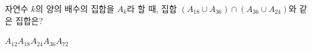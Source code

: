 자연수 $k$의 양의 배수의 집합을 $A_k$라 할 때, 집합 $(A_{18}\cup A_{36})\cap(A_{36}\cup A_{24})$와 같은 집합은?
\begin{choices32}{$A_{12}$}{$A_{18}$}{$A_{24}$}{$A_{36}$}{$A_{72}$}\end{choices32}
